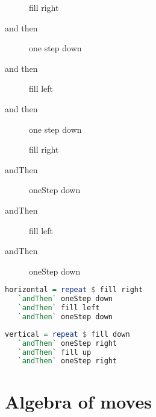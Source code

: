 \documentclass[10pt]{beamer}
\begin{document}
\begin{frame}[fragile]
\begin{description}
      \item[] fill right
      \item[and then] one step down
      \item[and then] fill left
      \item[and then] one step down
  \end{description}
\end{frame}
\begin{frame}[fragile]
\begin{description}
      \item[] fill right
      \item[andThen] oneStep down
      \item[andThen] fill left
      \item[andThen] oneStep down
  \end{description}
\end{frame}

\begin{frame}[fragile]
\begin{lstlisting}[language=haskell, basicstyle=\ttfamily]
horizontal = repeat $ fill right
   `andThen` oneStep down
   `andThen` fill left
   `andThen` oneStep down
\end{lstlisting}
\end{frame}

\begin{frame}[fragile]
\begin{lstlisting}[language=haskell, basicstyle=\ttfamily]
vertical = repeat $ fill down
   `andThen` oneStep right
   `andThen` fill up
   `andThen` oneStep right
\end{lstlisting}
\end{frame}

\section{Algebra of moves}
\end{document}
